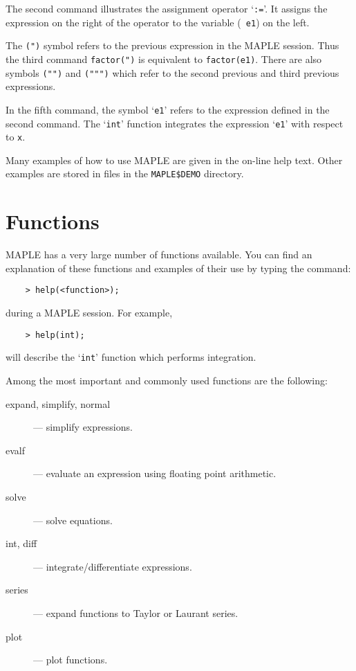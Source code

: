 The second command illustrates the assignment operator `{\tt :=}'. It
assigns the expression on the right of the operator to the variable ({\tt
e1}) on the left.

The {\tt (")} symbol refers to the previous expression in the MAPLE
session. Thus the third command \verb+factor(")+ is equivalent to
\verb+factor(e1)+. There are also symbols {\tt ("")} and {\tt (""")}
which refer to the second previous and third previous expressions.

In the fifth command, the symbol `{\tt e1}' refers to the expression
defined in the second command. The `{\tt int}' function integrates the
expression `{\tt e1}' with respect to {\tt x}.

Many examples of how to use MAPLE are given in the on-line help text.
Other examples are stored in files in the {\tt MAPLE\$DEMO} directory.

\section{Functions}

MAPLE has a very large number of functions available. You can find an
explanation of these functions and examples of their use by typing the
command:

\begin{verbatim}
    > help(<function>);
\end{verbatim}

during a MAPLE session. For example,

\begin{verbatim}
    > help(int);
\end{verbatim}

will describe the `{\tt int}' function which performs integration.

Among the most important and commonly used functions are the following:

\begin{description}
\begin{description}

\item [expand, simplify, normal] --- simplify expressions.
\item [evalf] --- evaluate an expression using floating point arithmetic.
\item [solve] --- solve equations.
\item [int, diff] --- integrate/differentiate expressions.
\item [series] --- expand functions to Taylor or Laurant series.
\item [plot] --- plot functions.

\end{description}
\end{description}

